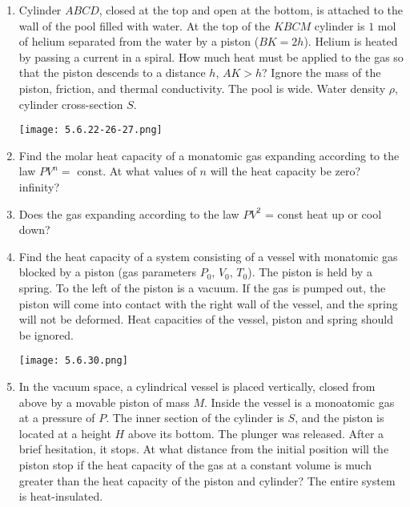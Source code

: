 \documentclass{article}
\begin{document}
\begin{enumerate}[label=5.6.\arabic*]
\item Cylinder $A B C D$, closed at the top and open at the bottom, is attached to the wall of the pool filled with water. At the top of the $K B C M$ cylinder is $1$ mol of helium separated from the water by a piston ($BK = 2h$). Helium is heated by passing a current in a spiral. How much heat must be applied to the gas so that the piston descends to a distance $h$, $AK > h$? Ignore the mass of the piston, friction, and thermal conductivity. The pool is wide. Water density $\rho$, cylinder cross-section $S$.

\begin{center}
    \texttt{[image: 5.6.22-26-27.png]}
\end{center}


\item Find the molar heat capacity of a monatomic gas expanding according to the law $PV^n =$ const. At what values of $n$ will the heat capacity be zero? infinity?

\item Does the gas expanding according to the law $PV^2$ = const heat up or cool down?

\item Find the heat capacity of a system consisting of a vessel with monatomic gas blocked by a piston (gas parameters $P_0$, $V_0$, $T_0$). The piston is held by a spring. To the left of the piston is a vacuum. If the gas is pumped out, the piston will come into contact with the right wall of the vessel, and the spring will not be deformed. Heat capacities of the vessel, piston and spring should be ignored.

\begin{center}
    \texttt{[image: 5.6.30.png]}
\end{center}


\item In the vacuum space, a cylindrical vessel is placed vertically, closed from above by a movable piston of mass $M$. Inside the vessel is a monoatomic gas at a pressure of $P$. The inner section of the cylinder is $S$, and the piston is located at a height $H$ above its bottom. The plunger was released. After a brief hesitation, it stops. At what distance from the initial position will the piston stop if the heat capacity of the gas at a constant volume is much greater than the heat capacity of the piston and cylinder? The entire system is heat-insulated.





\end{enumerate}
\end{document}
